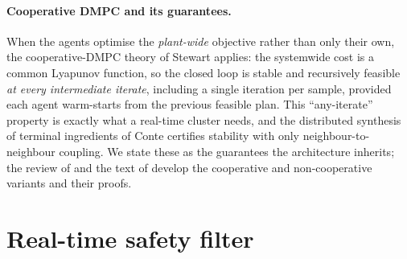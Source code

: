 \paragraph{Cooperative DMPC and its guarantees.} When the agents optimise the
\emph{plant-wide} objective rather than only their own, the cooperative-DMPC
theory of Stewart \etal \cite{stewart2010cooperative} applies: the systemwide
cost is a common Lyapunov function, so the closed loop is stable and recursively
feasible \emph{at every intermediate iterate}, including a single iteration per
sample, provided each agent warm-starts from the previous feasible plan. This
``any-iterate'' property is exactly what a real-time cluster needs, and the
distributed synthesis of terminal ingredients of Conte \etal
\cite{conte2016distributed} certifies stability with only neighbour-to-neighbour
coupling. We state these as the guarantees the architecture inherits; the review
of \cite{christofides2013distributed} and the text of \cite{rawlings2017model}
develop the cooperative and non-cooperative variants and their proofs.

\section{Real-time safety filter}
\label{sec:cbf}

